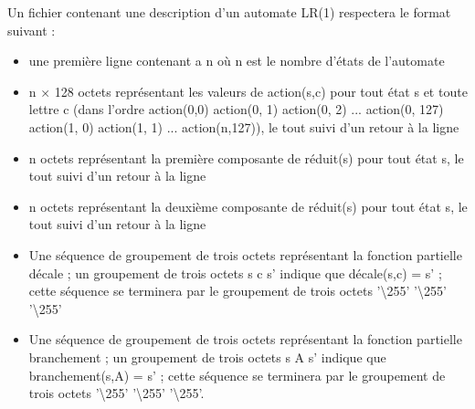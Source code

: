 Un fichier contenant une description d'un automate LR(1) respectera le format suivant :

\begin{itemize}
	\item une première ligne contenant a n où n est le nombre d'états de l'automate
	\item n × 128 octets représentant les valeurs de action(s,c) pour tout état s et toute lettre c (dans l'ordre action(0,0) action(0, 1) action(0, 2) ... action(0, 127) action(1, 0) action(1, 1) ... action(n,127)), le tout suivi d'un retour à la ligne
	\item n octets représentant la première composante de réduit(s) pour tout état s, le tout suivi d'un retour à la ligne
	\item n octets représentant la deuxième composante de réduit(s) pour tout état s, le tout suivi d'un retour à la ligne
	\item Une séquence de groupement de trois octets représentant la fonction partielle décale ; un groupement de trois octets s c s' indique que décale(s,c) = s' ; cette séquence se terminera par le groupement de trois octets '\textbackslash255' '\textbackslash255' '\textbackslash255'
	\item Une séquence de groupement de trois octets représentant la fonction partielle branchement ; un groupement de trois octets s A s' indique que branchement(s,A) = s' ; cette séquence se terminera par le groupement de trois octets '\textbackslash255' '\textbackslash255' '\textbackslash255'.
\end{itemize}


  

